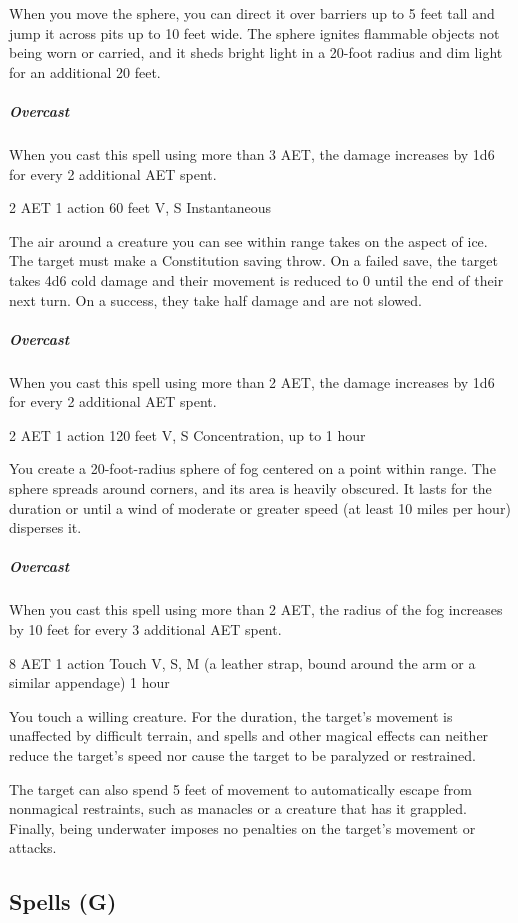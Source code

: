 When you move the sphere, you can direct it over barriers up to 5 feet tall and jump it across pits up to 10 feet wide. The sphere ignites flammable objects not being worn or carried, and it sheds bright light in a 20-foot radius and dim light for an additional 20 feet.

\subparagraph*{Overcast} When you cast this spell using more than 3 AET, the damage increases by 1d6 for every 2 additional AET spent.


{2 AET}
{1 action}
{60 feet}
{V, S}
{Instantaneous}

The air around a creature you can see within range takes on the aspect of ice. The target must make a Constitution saving throw. On a failed save, the target takes 4d6 cold damage and their movement is reduced to 0 until the end of their next turn. On a success, they take half damage and are not slowed.

\subparagraph*{Overcast} When you cast this spell using more than 2 AET, the damage increases by 1d6 for every 2 additional AET spent.


{2 AET}
{1 action}
{120 feet}
{V, S}
{Concentration, up to 1 hour}

You create a 20-foot-radius sphere of fog centered on a point within range. The sphere spreads around corners, and its area is heavily obscured. It lasts for the duration or until a wind of moderate or greater speed (at least 10 miles per hour) disperses it.

\subparagraph*{Overcast} When you cast this spell using more than 2 AET, the radius of the fog increases by 10 feet for every 3 additional AET spent.


{8 AET}
{1 action}
{Touch}
{V, S, M (a leather strap, bound around the arm or a similar appendage)}
{1 hour}

You touch a willing creature. For the duration, the target's movement is unaffected by difficult terrain, and spells and other magical effects can neither reduce the target's speed nor cause the target to be paralyzed or restrained.

The target can also spend 5 feet of movement to automatically escape from nonmagical restraints, such as manacles or a creature that has it grappled. Finally, being underwater imposes no penalties on the target's movement or attacks.

\subsection{Spells (G)}


